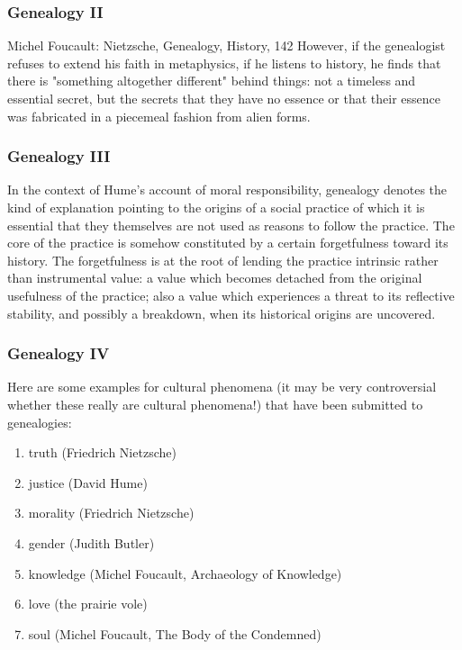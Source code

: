 \documentclass[xcolor=dvipsnames]{beamer}
\begin{document}
\begin{frame}
  \frametitle{Genealogy II}
  \begin{block}{Michel Foucault: Nietzsche, Genealogy, History, 142}
    However, if the genealogist refuses to extend his faith in
    metaphysics, if he listens to history, he finds that there is
    "something altogether different" behind things: not a timeless and
    essential secret, but the secrets that they have no essence or
    that their essence was fabricated in a piecemeal fashion from
    alien forms.
  \end{block}
\end{frame}

\begin{frame}
  \frametitle{Genealogy III}
    In the context of Hume's account of moral responsibility,
    genealogy denotes the kind of explanation pointing to the origins
    of a social practice of which it is essential that they themselves
    are not used as reasons to follow the practice. The core of the
    practice is somehow constituted by a certain forgetfulness toward
    its history. The forgetfulness is at the root of lending the
    practice intrinsic rather than instrumental value: a value which
    becomes detached from the original usefulness of the practice;
    also a value which experiences a threat to its reflective
    stability, and possibly a breakdown, when its historical origins
    are uncovered.
\end{frame}

\begin{frame}
  \frametitle{Genealogy IV}
Here are some examples for cultural phenomena (it may be very
controversial whether these really are cultural phenomena!) that have
been submitted to genealogies:
\begin{enumerate}
\item truth (Friedrich Nietzsche)
\item justice (David Hume)
\item morality (Friedrich Nietzsche)
\item gender (Judith Butler)
\item knowledge (Michel Foucault, Archaeology of Knowledge)
\item love (the prairie vole)
\item soul (Michel Foucault, The Body of the Condemned)
\end{enumerate}
\end{frame}
\end{document}
